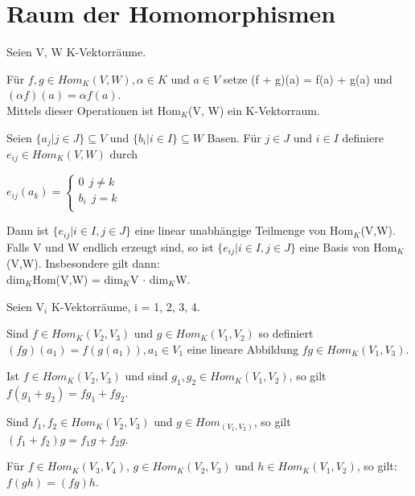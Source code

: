 \section{Raum der Homomorphismen}
\begin{lemma}
Seien V, W K-Vektorräume.
\begin{compactenum}
\item Für $f, g \in Hom_K(V, W), \alpha \in K$ und $a \in V$ setze (f + g)(a) = f(a) + g(a) und $(\alpha f)(a) = \alpha f(a)$.\\
Mittels dieser Operationen ist Hom$_K$(V, W) ein K-Vektorraum.
\item Seien $\{a_j | j \in J\} \subseteq V$ und $\{b_i | i \in I\} \subseteq W$ Basen. Für $j \in J$ und $i \in I$ definiere $e_{ij} \in Hom_K(V, W)$ durch
\begin{center}
$e_{ij}(a_k) =
\begin{cases}
0 ~~j \neq k\\
b_i~~ j = k\\
\end{cases}$
\end{center}
Dann ist $\{e_{ij} | i \in I, j \in J\}$ eine linear unabhängige Teilmenge von Hom$_K$(V,W). Falls V und W endlich erzeugt sind, so ist $\{e_{ij} | i \in I, j \in J\}$ eine Basis von Hom$_K$(V,W). Insbesondere  gilt dann:\\
dim$_K$Hom(V,W) = dim$_K$V $\cdot$ dim$_K$W.
\end{compactenum}
\end{lemma}

\begin{lemma}
Seien V$_i$ K-Vektorräume, i = 1, 2, 3, 4.
\begin{compactenum}
\item Sind $f \in Hom_K (V_2, V_3)$ und $g \in Hom_K (V_1, V_2)$ so definiert $(fg)(a_1) = f(g(a_1)), a_1 \in V_1$
eine lineare Abbildung $fg \in Hom_K(V_1,V_3)$.
\item Ist $f \in Hom_K (V_2, V_3)$ und sind $g_1, g_2 \in Hom_K (V_1, V_2)$, so gilt\\
$f(g_1 +g_2)=fg_1 +fg_2$.
\item Sind $f_1, f_2 \in Hom_K (V_2, V_3)$ und $g \in Hom_ (V_1, V_2)$, so gilt\\
$(f_1 + f_2)g = f_1g + f_2g$.
\item Für $f \in Hom_K(V_3,V_4)$, $g \in Hom_K(V_2,V_3)$ und $h \in Hom_K(V_1,V_2)$, so gilt: $f(gh) = (fg)h$.
\end{compactenum}
\end{lemma}

